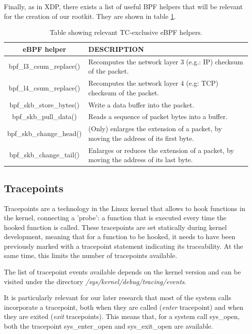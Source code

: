 \documentclass[12pt]{report} %
\begin{document}
Finally, as in XDP, there exists a list of useful BPF helpers that will be relevant for the creation of our rootkit. They are shown in table \ref{table:tc_helpers}.
\begin{table}[H]
\begin{tabular}{|c|>{\centering\arraybackslash}p{10cm}|}
\hline
eBPF helper & DESCRIPTION\\
\hline
\hline
bpf\_l3\_csum\_replace() & Recomputes the network layer 3 (e.g.: IP) checksum of the packet.\\
\hline
bpf\_l4\_csum\_replace() & Recomputes the network layer 4 (e.g: TCP) checksum of the packet.\\
\hline
bpf\_skb\_store\_bytes() & Write a data buffer into the packet.\\
\hline
bpf\_skb\_pull\_data() & Reads a sequence of packet bytes into a buffer.\\
\hline
bpf\_skb\_change\_head() & (Only) enlarges the extension of a packet, by moving the address of its first byte.\\
\hline
bpf\_skb\_change\_tail() & Enlarges or reduces the extension of a packet, by moving the address of its last byte.\\
\hline
\hline
\end{tabular}
\caption{Table showing relevant TC-exclusive eBPF helpers.}
\label{table:tc_helpers}
\end{table}


\subsection{Tracepoints}
Tracepoints are a technology in the Linux kernel that allows to hook functions in the kernel, connecting a 'probe': a function that is executed every time the hooked function is called\cite{tp_kernel}. These tracepoints are set statically during kernel development, meaning that for a function to be hooked, it needs to have been previously marked with a tracepoint statement indicating its traceability. At the same time, this limits the number of tracepoints available.

The list of tracepoint events available depends on the kernel version and can be visited under the directory \textit{/sys/kernel/debug/tracing/events}.

It is particularly relevant for our later research that most of the system calls incorporate a tracepoint, both when they are called (\textit{enter} tracepoint) and when they are exited (\textit{exit} tracepoints). This means that, for a system call sys\_open, both the tracepoint sys\_enter\_open and sys\_exit\_open are available. 
\end{document}

